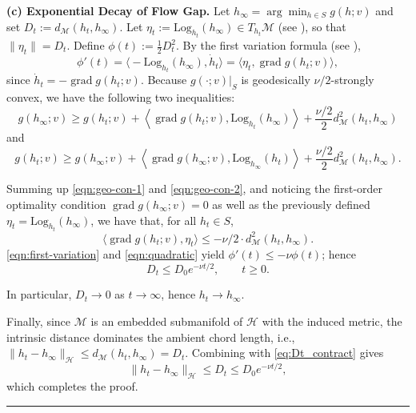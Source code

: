 \documentclass[twoside,11pt]{article}
\newcommand{\BlackBoxProof}{\rule{1.5ex}{1.5ex}}
\renewenvironment{proof}{\par\noindent{\bf Proof\ }}{\hfill\BlackBoxProof\par\medskip}
\newcommand{\ip}[1]{\left\langle #1 \right\rangle}
\newcommand{\grad}{\operatorname{grad} }
\newcommand{\Log}{\mathrm{Log}}
\begin{document}
\begin{proof}
\textbf{(c) Exponential Decay of Flow Gap.}
Let $h_\infty=\arg\min_{h\in S} g(h;v)$ and set $D_t:=d_{\mathcal M}(h_t,h_\infty)$.
Let $\eta_t:=\Log_{h_t}(h_\infty)\in T_{h_t}\mathcal M$ (see \citep[Definition~10.2]{boumal2023intromanifolds}), so that $\|\eta_t\|=D_t$.
Define $\phi(t):=\frac12 D_t^2$. By the first variation formula (see \citep[Theorem~6.3]{lee2006riemannian}),
\begin{equation}\label{eqn:first-variation}
\phi'(t)=\Big\langle -\Log_{h_t}(h_\infty),\dot h_t\Big\rangle
=\langle \eta_t,\grad g(h_t;v)\rangle,
\end{equation}
since $\dot h_t=-\grad g(h_t;v)$.
Because $g(\cdot;v)|_S$ is geodesically $\nu/2$-strongly convex, we have the following two inequalities:
\begin{equation}\label{eqn:geo-con-1}
g(h_\infty;v) \geq g(h_t;v) + \ip{\grad g(h_t;v),\Log_{h_t}(h_\infty)} + \frac{\nu/2}{2}d^2_{\mathcal{M}}(h_t,h_\infty)
\end{equation}
and
\begin{equation}\label{eqn:geo-con-2}
g(h_t;v) \geq g(h_\infty;v) + \ip{\grad g(h_\infty;v), \Log_{h_\infty}(h_t)} + \frac{\nu/2}{2}d^2_{\mathcal{M}}(h_t,h_\infty).
\end{equation}

Summing up \eqref{eqn:geo-con-1} and \eqref{eqn:geo-con-2}, and noticing the first-order optimality condition $\grad g(h_\infty;v) = 0$ as well as the previously defined $\eta_t = \Log_{h_t}(h_\infty)$, we have that, for all
$h_t \in S$,
\begin{equation}\label{eqn:quadratic}
\langle \grad g(h_t;v),\eta_t\rangle \le -\nu/2 \cdot d_{\mathcal M}^2(h_t,h_\infty).
\end{equation}
\eqref{eqn:first-variation} and \eqref{eqn:quadratic} yield $\phi'(t)\le -\nu \phi(t)$; hence
\begin{equation}\label{eq:Dt_contract}
D_t \le D_0 e^{-\nu t/2},\qquad t\ge 0.
\end{equation}

In particular, $D_t\to 0$ as $t\to\infty$, hence $h_t\to h_\infty$.

Finally, since $\mathcal M$ is an embedded submanifold of $\mathcal H$ with the induced metric,
the intrinsic distance dominates the ambient chord length, i.e.,
$\|h_t-h_\infty\|_{\mathcal H}\le d_{\mathcal M}(h_t,h_\infty)=D_t$.
Combining with \eqref{eq:Dt_contract} gives
\[
\|h_t-h_\infty\|_{\mathcal H}\le D_t \le D_0 e^{-\nu t/2},
\]
which completes the proof.
\end{proof}
\end{document}
